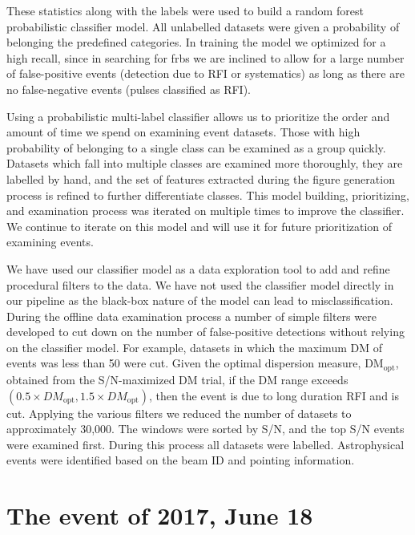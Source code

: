 \documentclass[a4paper,fleqn,usenatbib]{mnras}
\begin{document}
These statistics along with the labels were used to build a random forest
probabilistic classifier model. All unlabelled datasets were given a probability
of belonging the predefined categories. In training the model we optimized for a
high recall, since in searching for \glspl{frb} we are inclined to allow for a
large number of false-positive events (detection due to RFI or systematics) as
long as there are no false-negative events (pulses classified as RFI).

Using a probabilistic multi-label classifier
allows us to prioritize the order and amount of time we spend on examining event
datasets. Those with high probability of belonging to a single class can be
examined as a group quickly.  Datasets which fall into multiple classes are
examined more thoroughly, they are labelled by hand, and the set of features
extracted during the figure generation process is refined to further
differentiate classes. This model building, prioritizing, and examination
process was iterated on multiple times to improve the classifier. We continue to
iterate on this model and will use it for future prioritization of examining
events.

We have used our classifier model as a data exploration tool to add and refine
procedural filters to the data. We have not used the classifier model directly
in our pipeline as the black-box nature of the model can lead to
misclassification.  During the offline data examination process a number of
simple filters were developed to cut down on the number of false-positive
detections without relying on the classifier model. For example, datasets in
which the maximum DM of events was less than 50 were cut.  Given the optimal
dispersion measure, DM$_{\textrm{opt}}$, obtained from the S/N-maximized DM
trial,  if the DM range exceeds $(0.5 \times DM_{\textrm{opt}}, 1.5 \times
DM_{\textrm{opt}})$, then the event is due to long duration RFI and is cut.
Applying the various filters we reduced the number of datasets to approximately
30,000. The windows were sorted by S/N, and the top S/N events were examined
first.  During this process all datasets were labelled.  Astrophysical events
were identified based on the beam ID and pointing information.


\section{The event of 2017, June 18}
\label{sec:18062017}
\end{document}
